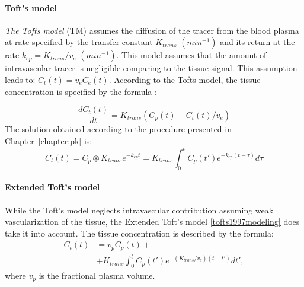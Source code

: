 \paragraph{Toft's model}

\textit{The Tofts model} \cite{tofts1991measurement} (TM) assumes the diffusion of the tracer from the blood plasma at rate specified by the transfer constant $K_{trans}$ $(min^{-1})$ and its return at the rate $k_{ep} = K_{trans}/v_e$ $(min^{-1})$. This model assumes that the amount of intravascular tracer is negligible comparing to the tissue signal. This assumption leads to: $C_t(t) = v_eC_e(t)$. According to the Tofts model, the tissue concentration is specified by the formula \cite{tofts2010t1, tofts1991measurement}:
 
\begin{equation}
	\label{eq:toft}
	\frac{dC_{t}(t)}{dt} = K_{trans}(C_p(t)-C_t(t)/v_e)
\end{equation} 
The solution obtained according to the procedure presented in Chapter~\ref{chapter:pk} is:
\begin{equation}
	\label{eq:toft2}
	C_{t}(t) =C_p\circledast K_{trans}e^{-k_{ep}t} =K_{trans}\int_{0}^{t}C_p(t')e^{-k_{ep}(t-\tau)}d\tau  
\end{equation}

\paragraph{Extended Toft's model}
While the Toft's model neglects intravascular contribution assuming weak vascularization of the tissue, the Extended Toft's model \ref{tofts1997modeling} does take it into account. The tissue concentration is described by the formula:
\begin{align}
	\label{eq:extended_toft}
	\nonumber C_{t}(t) &= v_pC_p(t)+\\ 
	&+ K_{trans}\int_{0}^{t}C_p(t')e^{-(K_{trans}/v_e)(t-t')}dt', 
\end{align}
where $v_p$ is the fractional plasma volume. 

